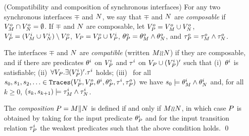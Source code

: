 \begin{defi}{(Compatibility and composition of synchronous interfaces)}
\label{def-moore-compatible} For any two synchronous interfaces
$\mp$ and $N$, we say that $\mp$ and $N$ are {\em
composable\/} if ${ V}^o_M \cap {V}^o_N = \emptyset$. If
$\mp$ and $N$ are composable, let ${ V}^o_P = { V}^o_M
\cup {V}^o_N$, ${ V}^i_P = ({ V}^i_M \cup {V}^i_N)
\setminus {V}^o_P$, ${ V}_P = { V}^o_P \cup {V}^i_P$,
$\theta^o_P = \theta^o_M \wedge \theta^o_N$, and $\tau^o_P =
\tau^o_M \wedge \tau^o_N$.

The interfaces $\mp$ and $N$ are {\em compatible\/} (written
$M{\wr}{\wr}N$) if they are composable, and if there are
predicates $\theta^i$ on ${ V}^i_P$ and $\tau^i$ on ${ V}_P
\cup ({ V}^i_P)'$ such that (i)~$\theta^i$ is satisfiable;
(ii)~$\forall {V}_P . \exists ({ V}^i_P)' . \tau^i$ holds;
(iii)~ for all $s_0, s_1, s_2, \ldots \in {\tt Traces}({ V}^i_P,
{ V}^o_P, \theta^i, \theta^o_P, \tau^i, \tau^o_P)$ we have
$s_0 \models \theta^i_M \wedge \theta^i_N$ and, for all $k \geq 0$,
$(s_k, s_{k+1}) \models \tau^i_M \wedge \tau^i_N$.

The {\em composition\/} $P = M \| N$ is defined if and only
if $M{\wr}{\wr}N$, in which case $P$ is obtained by taking for
the input predicate $\theta^i_P$ and for the input transition
relation $\tau^i_P$ the weakest predicates such that the above
condition holds. \qed
\end{defi}

